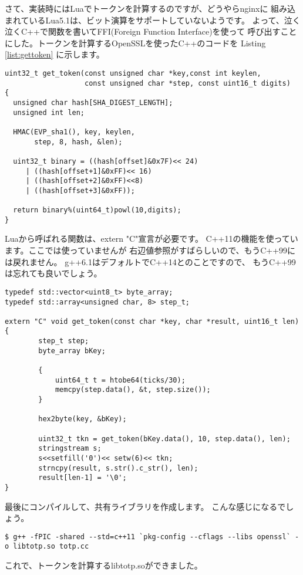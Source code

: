 さて、実装時にはLuaでトークンを計算するのですが、どうやらnginxに
組み込まれているLua5.1は、ビット演算をサポートしていないようです。
よって、泣く泣くC++で関数を書いてFFI(Foreign Function Interface)を使って
呼び出すことにした。トークンを計算するOpenSSLを使ったC++のコードを
Listing \ref{list:gettoken} に示します。

\begin{lstlisting}[caption=トークンの計算(C++),label=list:gettoken]
uint32_t get_token(const unsigned char *key,const int keylen, 
             	   const unsigned char *step, const uint16_t digits)
{
  unsigned char hash[SHA_DIGEST_LENGTH];
  unsigned int len;

  HMAC(EVP_sha1(), key, keylen, 
       step, 8, hash, &len);

  uint32_t binary = ((hash[offset]&0x7F)<< 24)
     | ((hash[offset+1]&0xFF)<< 16)
     | ((hash[offset+2]&0xFF)<<8)
     | ((hash[offset+3]&0xFF));

  return binary%(uint64_t)powl(10,digits);
}
\end{lstlisting}

Luaから呼ばれる関数は、extern "C"宣言が必要です。
C++11の機能を使っています。ここでは使っていませんが
右辺値参照がすばらしいので、もうC++99には戻れません。
g++6.1はデフォルトでC++14とのことですので、
もうC++99は忘れても良いでしょう。

\begin{lstlisting}[caption=呼び出し用の関数,label=list:caller]
typedef std::vector<uint8_t> byte_array;
typedef std::array<unsigned char, 8> step_t;

extern "C" void get_token(const char *key, char *result, uint16_t len)
{
        step_t step;
        byte_array bKey;
        
		{
        	uint64_t t = htobe64(ticks/30);
        	memcpy(step.data(), &t, step.size());
		}

        hex2byte(key, &bKey);

        uint32_t tkn = get_token(bKey.data(), 10, step.data(), len);
        stringstream s;
        s<<setfill('0')<< setw(6)<< tkn;
        strncpy(result, s.str().c_str(), len);
        result[len-1] = '\0';
}
\end{lstlisting}

最後にコンパイルして、共有ライブラリを作成します。
こんな感じになるでしょう。

\begin{lstlisting}[caption=共有ライブラリの作成,label=list:sharedlib]
$ g++ -fPIC -shared --std=c++11 `pkg-config --cflags --libs openssl` -o libtotp.so totp.cc
\end{lstlisting}
これで、トークンを計算するlibtotp.soができました。
